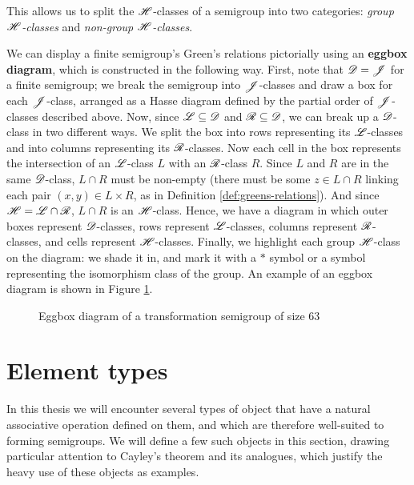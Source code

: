 This allows us to split the $\mathrel{\mathscr{H}}$-classes of a semigroup into two categories:
\textit{group $\mathrel{\mathscr{H}}$-classes} and \textit{non-group $\mathrel{\mathscr{H}}$-classes}.

We can display a finite semigroup's Green's relations pictorially using an
\textbf{eggbox diagram}, which is constructed in the following way.  First, note
that $\mathscr{D} = \mathscr{J}$ for a finite semigroup; we break the semigroup into
$\mathscr{J}$-classes and draw a box for each $\mathscr{J}$-class, arranged as a Hasse diagram
defined by the partial order of $\mathscr{J}$-classes described above.  Now, since
$\mathscr{L} \subseteq \mathscr{D}$ and $\mathscr{R} \subseteq \mathscr{D}$, we can break up a $\mathscr{D}$-class in
two different ways.  We split the box into rows representing its $\mathscr{L}$-classes
and into columns representing its $\mathscr{R}$-classes.  Now each cell in the box
represents the intersection of an $\mathscr{L}$-class $L$ with an $\mathscr{R}$-class $R$.
Since $L$ and $R$ are in the same $\mathscr{D}$-class, $L \cap R$ must be non-empty
(there must be some $z \in L \cap R$ linking each pair $(x,y) \in L \times R$,
as in Definition \ref{def:greens-relations}).  And since $\mathscr{H} = \mathscr{L} \cap \mathscr{R}$,
$L \cap R$ is an $\mathscr{H}$-class.  Hence, we have a diagram in which outer boxes
represent $\mathscr{D}$-classes, rows represent $\mathscr{L}$-classes, columns represent
$\mathscr{R}$-classes, and cells represent $\mathscr{H}$-classes.  Finally, we highlight each
group $\mathscr{H}$-class on the diagram: we shade it in, and mark it with a $*$ symbol
or a symbol representing the isomorphism class of the group.  An example of an
eggbox diagram is shown in Figure \ref{fig:eggbox-diagram}.

\begin{figure}[p]
  \centering
  
  \caption{Eggbox diagram of a transformation semigroup of size 63}
  \label{fig:eggbox-diagram}
\end{figure}

\section{Element types}
\label{sec:element-types}

In this thesis we will encounter several types of object that have a natural
associative operation defined on them, and which are therefore well-suited to
forming semigroups.  We will define a few such objects in this section, drawing
particular attention to Cayley's theorem and its analogues, which justify the
heavy use of these objects as examples.

